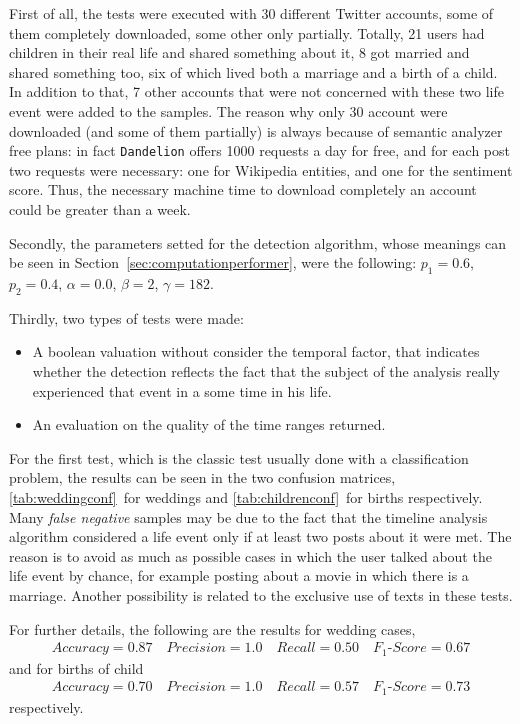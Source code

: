 First of all, the tests were executed with 30 different Twitter accounts, some of them completely downloaded, some other only partially. Totally, 21 users had children in their real life and shared something about it, 8 got married and shared something too, six of which lived both a marriage and a birth of a child. In addition to that, 7 other accounts that were not concerned with these two life event were added to the samples. The reason why only 30 account were downloaded (and some of them partially) is always because of semantic analyzer free plans: in fact \texttt{Dandelion} offers 1000 requests a day for free, and for each post two requests were necessary: one for Wikipedia entities, and one for the sentiment score. Thus, the necessary machine time to download completely an account could be greater than a week.

Secondly, the parameters setted for the detection algorithm, whose meanings can be seen in Section~\ref{sec:computationperformer}, were the following: $p_1 = 0.6$, $p_2 = 0.4$, $\alpha = 0.0$, $ \beta = 2$, $ \gamma = 182$.

Thirdly, two types of tests were made:
\begin{itemize}
\item A boolean valuation without consider the temporal factor, that indicates whether the detection reflects the fact that the subject of the analysis really experienced that event in a some time in his life.
\item An evaluation on the quality of the time ranges returned.
\end{itemize}
For the first test, which is the classic test usually done with a classification problem, the results can be seen in the two confusion matrices, \ref{tab:weddingconf}~for weddings and \ref{tab:childrenconf}~for births respectively. Many \emph{false negative} samples may be due to the fact that the timeline analysis algorithm considered a life event only if at least two posts about it were met. The reason is to avoid as much as possible cases in which the user talked about the life event by chance, for example posting about a movie in which there is a marriage. Another possibility is related to the exclusive use of texts in these tests.

For further details, the following are the results for wedding cases,
\begin{gather}
Accuracy = 0.87 \quad Precision = 1.0 \quad Recall = 0.50 \quad F_1\text{-}Score = 0.67
\label{weddingconfdata}
\end{gather}
and for births of child
\begin{gather}
Accuracy = 0.70 \quad Precision = 1.0 \quad Recall = 0.57 \quad F_1\text{-}Score = 0.73
\label{childrenconfdata}
\end{gather}
respectively.

